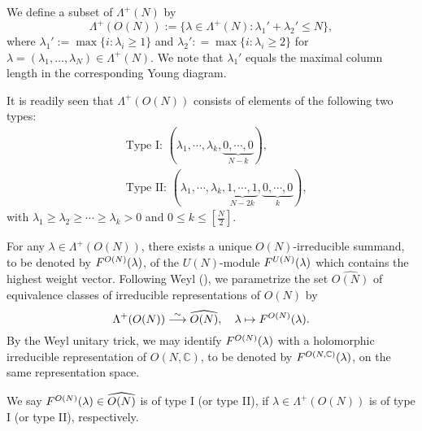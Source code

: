 We define a subset of $\Lambda^+(N)$ by
\begin{equation*}
\Lambda^+(O(N)):= \{\lambda \in \Lambda^+(N):
\lambda_1' + \lambda_2' \leq N\},
\end{equation*}
where $\lambda_1':=\max\{i : \lambda_i \geq 1 \}$ and 
$\lambda_2': = \max\{i : \lambda_i \geq 2\}$ 
for $\lambda =(\lambda_1, \ldots, \lambda_N) \in \Lambda^+(N)$.
We note that $\lambda_1'$ equals the maximal column length
 in the corresponding Young diagram.  



It is readily seen that $\Lambda^+(O(N))$ consists of elements of 
the following two types:
\begin{align}
\label{eqn:TypeI}
&\text{Type I: $(\lambda_1,\cdots,\lambda_k,\underbrace{0,\cdots,0}_{N-k})$,}
\\
\label{eqn:TypeII}
&\text{Type II: $(\lambda_1,\cdots,\lambda_k,\underbrace{1,\cdots,1}_{N-2k},\underbrace{0,\cdots,0}_k)$,}
\end{align}
 with $\lambda_1\geq \lambda_2\geq\cdots\geq \lambda_k > 0$ and $0\leq k\leq\left[\frac N2\right]$.



For any $\lambda \in \Lambda^+(O(N))$, 
 there exists a unique $O(N)$-irreducible summand, 
 to be denoted by 
$F^{{O(N)}}({\lambda})$, 
 of the $U(N)$-module $F^{{U(N)}}({\lambda})$
 which contains the highest weight vector.  
Following Weyl (\cite[Chap.~V, Sect.~7]{Weyl97}),
we parametrize the set $\widehat{O(N)}$ of equivalence classes
of irreducible representations of $O(N)$ by
\begin{equation} 
\label{eqn:CWOn}
\Lambda^+(O(N)) \stackrel{\sim}{\longrightarrow} \widehat{O(N)},
\quad
\lambda \mapsto F^{{O(N)}}({\lambda}).  
\end{equation}
By the Weyl unitary trick, 
 we may identify
 $F^{{O(N)}}({\lambda})$ 
 with a holomorphic irreducible representation
 of $O(N,{\mathbb{C}})$, 
 to be denoted by 
 $F^{{O(N,{\mathbb{C}})}}({\lambda})$, 
 on the same representation space.  



\begin{definition}
\label{def:type}
We say $F^{{O(N)}}({\lambda}) \in \widehat{O(N)}$ is of type I
 (or type II), 
 if $\lambda \in \Lambda^+(O(N))$ is of 
 type I (or type II), 
respectively.  
\end{definition}



